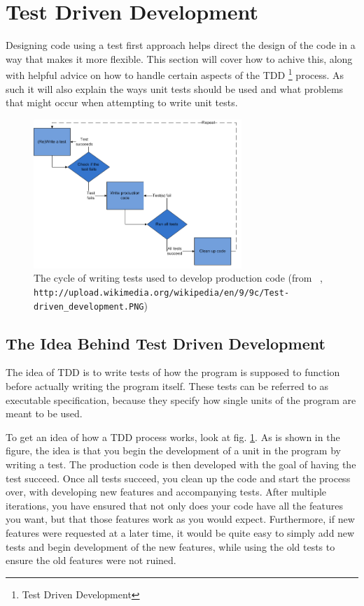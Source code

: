 
\section{Test Driven Development}

Designing code using a test first approach helps direct the design
of the code in a way that makes it more flexible. This section will
cover how to achive this, along with helpful advice on how to handle
certain aspects of the TDD%
\footnote{Test Driven Development%
} process. As such it will also explain the ways unit tests should
be used and what problems that might occur when attempting to write
unit tests. 

\begin{figure}
\begin{centering}
\includegraphics[width=0.7\textwidth]{TestWrittenCycle}
\par\end{centering}

\caption{The cycle of writing tests used to develop production code (from ~\cite{WikiTDD},
\texttt{http://upload.wikimedia.org/wikipedia/en/9/9c/Test-driven\_development.PNG})\label{fig:TestWrittenCycle}}
\end{figure}



\subsection*{The Idea Behind Test Driven Development}

The idea of TDD is to write tests of how the program is supposed to
function before actually writing the program itself. These tests can
be referred to as executable specification, because they specify how
single units of the program are meant to be used.

To get an idea of how a TDD process works, look at fig. \ref{fig:TestWrittenCycle}.
As is shown in the figure, the idea is that you begin the development
of a unit in the program by writing a test. The production code is
then developed with the goal of having the test succeed. Once all
tests succeed, you clean up the code and start the process over, with
developing new features and accompanying tests. After multiple iterations,
you have ensured that not only does your code have all the features
you want, but that those features work as you would expect. Furthermore,
if new features were requested at a later time, it would be quite
easy to simply add new tests and begin development of the new features,
while using the old tests to ensure the old features were not ruined.

